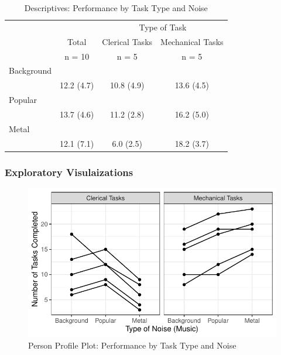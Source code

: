 \documentclass[
]{article}
\begin{document}
\begin{table}[ ht ] 
\centering 
\caption{Descriptives: Performance by Task Type and Noise}\label{}
\begin{tabular}{ l c c c }
\toprule
 &   &  \multicolumn{ 2 }{c}{ Type of Task }\\ 
  & Total & Clerical Tasks & Mechanical Tasks \\ 
 & n = 10 & n = 5 & n = 5 \\ 
 \midrule
Background &   &   &  \\ 
\hspace{6pt}   & 12.2 (4.7) & 10.8 (4.9) & 13.6 (4.5)\\ 
Popular &   &   &  \\ 
\hspace{6pt}   & 13.7 (4.6) & 11.2 (2.8) & 16.2 (5.0)\\ 
Metal &   &   &  \\ 
\hspace{6pt}   & 12.1 (7.1) & 6.0 (2.5) & 18.2 (3.7)\\ 
\bottomrule

\end{tabular}
\end{table}

\clearpage

\hypertarget{exploratory-visulaizations}{%
\subsubsection{Exploratory
Visulaizations}\label{exploratory-visulaizations}}

\begin{figure}

{\centering \includegraphics{Chapter-16-Assignment-R-Skeleton--2020spring-_files/figure-latex/unnamed-chunk-4-1} 

}

\caption{Person Profile Plot: Performance by Task Type and Noise}\label{fig:unnamed-chunk-4}
\end{figure}
\end{document}
